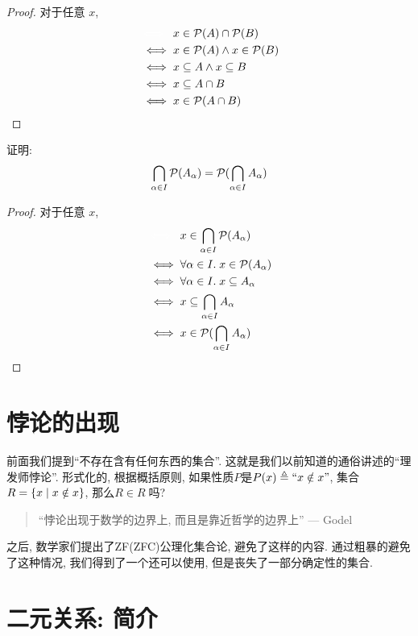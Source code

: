 \begin{proof}
  对于任意 $x$,
  \begin{align*}
    &\textcolor{white}{\iff}\;\; x \in \ps{A} \cap \ps{B} \\
    &\iff x \in \ps{A} \land x \in \ps{B} \\
    &\iff x \subseteq A \land x \subseteq B \\
    &\iff x \subseteq A \cap B \\
    &\iff x \in \ps{A \cap B}
  \end{align*}
\end{proof}

\begin{theorem}
  证明: 
  \[
    \bigcap_{\alpha \in I} \mathcal{P}(A_{\alpha}) = \mathcal{P}(\bigcap_{\alpha \in I} A_{\alpha})
  \]
\end{theorem}

\begin{proof}
  对于任意 $x$,
  \begin{align*}
    &\textcolor{white}{\iff}\;\; x \in \bigcap_{\alpha \in I} \ps{A_{\alpha}} \\
    &\iff \forall \alpha \in I.\; x \in \ps{A_{\alpha}} \\
    &\iff \forall \alpha \in I.\; x \subseteq A_{\alpha} \\
    &\iff x \subseteq \bigcap_{\alpha \in I} A_{\alpha} \\
    &\iff x \in \ps{\bigcap_{\alpha \in I} A_{\alpha}}
  \end{align*}
\end{proof}

\section{悖论的出现}

前面我们提到``不存在含有任何东西的集合''. 这就是我们以前知道的通俗讲述的``理发师悖论''. 形式化的, 根据概括原则, 如果性质$P$是$P(x) \triangleq ``x \notin x"$, 集合$R = \{x \mid x \notin x\}$, 那么$R \in R\;$吗? 

\begin{quote}
  ``悖论出现于数学的边界上, 而且是靠近哲学的边界上''
  \hfill --- Godel
\end{quote}

之后, 数学家们提出了ZF(ZFC)公理化集合论, 避免了这样的内容. 通过粗暴的避免了这种情况, 我们得到了一个还可以使用, 但是丧失了一部分确定性的集合. 


\section{二元关系: 简介}


